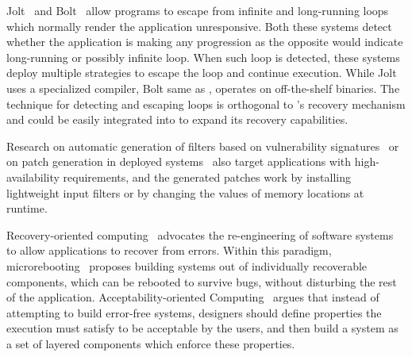 Jolt~\cite{jolt} and Bolt~\cite{bolt} allow programs to escape from infinite
and long-running loops which normally render the application unresponsive. Both
these systems detect whether the application is making any progression as the
opposite would indicate long-running or possibly infinite loop. When such loop
is detected, these systems deploy multiple strategies to escape the loop and
continue execution.  While Jolt uses a specialized compiler, Bolt same as \mx,
operates on off-the-shelf binaries. The technique for detecting and escaping
loops is orthogonal to \mx's recovery mechanism and could be easily integrated
into \rem to expand its recovery capabilities.

Research on automatic generation of filters based on vulnerability
signatures~\cite{song:oakland06,vigilante} 
or on patch
generation in deployed systems~\cite{clearview}
also target applications with high-availability requirements, and the
generated patches work by installing lightweight input filters or by changing
the values of memory locations at runtime.

Recovery-oriented computing~\cite{roc} advocates the re-engineering of software
systems to allow applications to recover from errors. Within this paradigm,
microrebooting~\cite{microreboots} proposes building systems out of
individually recoverable components, which can be rebooted to survive bugs,
without disturbing the rest of the application. Acceptability-oriented
Computing~\cite{aoc:oopsla03} argues that instead of attempting to build
error-free systems, designers should define properties the execution must
satisfy to be acceptable by the users, and then build a system as a set of
layered components which enforce these properties.

